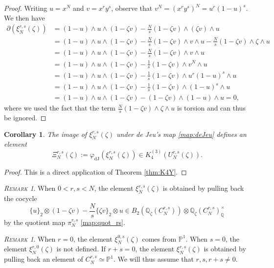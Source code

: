 \documentclass[11pt,a4,leqno]{amsart}
\theoremstyle{my theoremstyle}
\newtheorem{cor}[thm]{Corollary}
\theoremstyle{dfn}
\theoremstyle{remark}
\newtheorem{rmk}[thm]{{\scshape Remark}}
\renewcommand{\1}{\mathbbm{1}}
\newcommand{\Q}{\mathbb{Q}}
\newcommand{\z}{\zeta}
\numberwithin{equation}{section}
\begin{document}
\begin{proof}
Writing $u=x^N$ and $v=x^r y^s$, observe that $v^N=(x^r y^s)^N=u^r(1-u)^s$.
We then have 
\begin{align*}
\partial(\xi^{r,s}_N(\z)) & = (1-u)\wedge u \wedge (1- \z v)-  \frac{N}{s}(1- \z v)\wedge (\z v) \wedge u \\
& =(1-u)\wedge u \wedge (1- \z v)-  \frac{N}{s}(1- \z v)\wedge v \wedge u - \frac{N}{s}(1- \z v)\wedge \z \wedge u \\
& =(1-u)\wedge u \wedge (1- \z v)-  \frac{N}{s}(1- \z v)\wedge v \wedge u \\
& =(1-u)\wedge u \wedge (1- \z v)-  \frac{1}{s}(1- \z v)\wedge v^N \wedge u \\
& =(1-u)\wedge u \wedge (1- \z v)-  \frac{1}{s}(1- \z v)\wedge u^r(1-u)^s \wedge u \\
& =(1-u)\wedge u \wedge (1- \z v)-  \frac{1}{s}(1- \z v)\wedge (1-u)^s \wedge u \\
& =(1-u)\wedge u \wedge (1- \z v)-  (1- \z v)\wedge (1-u) \wedge u =0,
\end{align*}
where we used the fact that the term $\frac{N}{s}(1- \z v)\wedge \z \wedge u$ is torsion and can thus be ignored.    
\end{proof}

\begin{cor}\label{cor:K4open}
    The image of $\xi_N^{r,s}(\z)$ under de Jeu's map \eqref{map:deJeu} defines an element $$\Xi_N^{r,s}(\zeta):=\varphi_{\mathrm{dJ}}(\xi_N^{r,s}(\z)) \in K_4^{(3)}(U_N^{r,s}(\z)).$$
\end{cor}

\begin{proof}
    This is a direct application of Theorem \ref{thm:K4Y}.
\end{proof}

\begin{rmk}
    When $0<r,s<N$, the element $\xi_N^{r,s}(\z)$ is obtained by pulling back the cocycle 
    $$\{ u \}_2 \otimes (1-\z v) - \frac{N}{s} \{ \z v \}_2 \otimes u \in B_2(\Q_{\z}(C^{r,s}_N))\otimes \Q_{\z}(C^{r,s}_N)^\times_{\Q}$$ 
    by the quotient map $\pi_N^{r,s}$ \eqref{map:quot_rs}.
\end{rmk}

\begin{rmk}
    When $r=0$, the element $\xi_N^{0,s}(\zeta)$ comes from $\mathbb{P}^1$. 
When $s=0$, the element $\xi_N^{r,0}(\zeta)$ is not defined.  
If $r+s=0$, the element $\xi_N^{r,s}(\zeta)$ is obtained by pulling back an element of $C_N^{r,s} \simeq \mathbb{P}^1$. 
We will thus assume that $r, s, r+s \neq 0$. 
\end{rmk}
\end{document}

